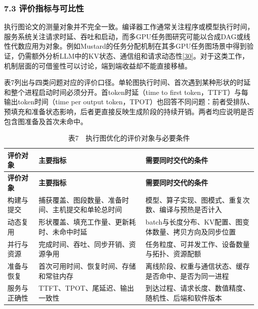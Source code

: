 \documentclass[UTF8,11pt,fontset=windows]{ctexart}
\begin{document}
\hypertarget{section-7-3}{%
\subsubsection{\texorpdfstring{\textbf{7.3 评价指标与可比性}}{7.3 评价指标与可比性}}\label{section-7-3}}

执行图论文的测量对象并不完全一致。编译器工作通常关注程序或模型执行时间，服务系统关注请求时延、吞吐和启动，而多GPU任务图研究可能以合成DAG或线性代数应用为对象。例如Mustard的任务分配机制在其多GPU任务图场景中得到验证，仍需额外分析LLM中的KV状态、通信组和请求动态性\protect\hyperlink{ref-30}{{[}30{]}}。对于这类工作，机制层面的可借鉴性可以讨论，端到端收益却不能直接移植。

表7列出与四类问题对应的评价口径。单轮图执行时间、首次遇到某种形状的时延和整个进程启动时间必须分开。首token时延（time to first token，TTFT）与每输出token时间（time per output token，TPOT）也回答不同问题：前者受排队、预填充和准备状态影响，后者更直接反映生成阶段的持续开销。两者均应说明是否包含图准备及首次未命中。

\begingroup\small
\begin{longtable}[]{@{}>{\raggedright\arraybackslash}p{}>{\raggedright\arraybackslash}p{}>{\raggedright\arraybackslash}p{}@{}}
\caption{表7　执行图优化的评价对象与必要条件}\tabularnewline
\toprule
\textbf{评价对象} & \textbf{主要指标} & \textbf{需要同时交代的条件} \\
\midrule
\endfirsthead
\toprule
\textbf{评价对象} & \textbf{主要指标} & \textbf{需要同时交代的条件} \\
\midrule
\endhead
构建与提交 & 捕获覆盖、图段数量、准备时间、主机提交和单轮总时间 & 模型、算子实现、图模式、重复次数、编译与预热是否计入 \\
动态复用 & 形状覆盖、填充工作量、更新耗时、未命中时延 & batch与长度分布、KV配置、图变体数量、拷贝方向及同步位置 \\
并行与资源 & 完成时间、吞吐、同步开销、资源争用 & 任务粒度、可并发工作、设备数量与拓扑、资源配额 \\
准备与恢复 & 首次可用时间、恢复时间、存储和常驻内存 & 离线阶段、权重与通信状态、缓存是否命中、是否为同一进程 \\
服务与正确性 & TTFT、TPOT、尾延迟、输出一致性 & 到达过程、请求长度、数值精度、随机性、后端和软件版本 \\
\bottomrule
\end{longtable}
\endgroup
\end{document}
